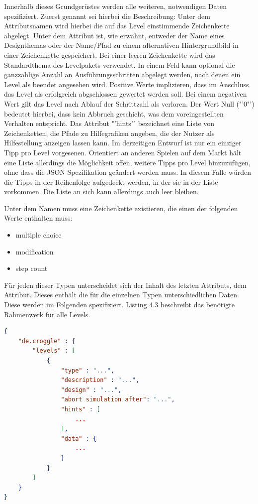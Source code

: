 Innerhalb dieses Grundgerüstes werden alle weiteren, notwendigen Daten spezifiziert.
Zuerst genannt sei hierbei die Beschreibung: Unter dem Attributsnamen  wird hierbei die auf das Level einstimmende Zeichenkette abgelegt.
Unter dem Attribut  ist, wie erwähnt, entweder der Name eines Designthemas oder der Name/Pfad zu einem alternativen Hintergrundbild in einer Zeichenkette gespeichert.
Bei einer leeren Zeichenkette wird das Standardthema des Levelpakets verwendet.
In einem Feld  kann optional die ganzzahlige Anzahl an Ausführungsschritten abgelegt werden, nach denen ein Level als beendet angesehen wird.
Positive Werte implizieren, dass im Anschluss das Level als erfolgreich abgschlossen gewertet werden soll.
Bei einem negativen Wert gilt das Level nach Ablauf der Schrittzahl als verloren.
Der Wert Null ("'0"') bedeutet hierbei, dass kein Abbruch geschieht, was dem voreingestellten Verhalten entspricht.
Das Attribut "'hints"' bezeichnet eine Liste von Zeichenketten, die Pfade zu Hilfegrafiken angeben, die der Nutzer als Hilfestellung anzeigen lassen kann.
Im derzeitigen Entwurf ist nur ein einziger Tipp pro Level vorgesenen.
Orientiert an anderen Spielen auf dem Markt hält eine Liste allerdings die Möglichkeit offen, weitere Tipps pro Level hinzuzufügen, ohne dass die JSON Spezifikation geändert werden muss.
In diesem Falle würden die Tipps in der Reihenfolge aufgedeckt werden, in der sie in der Liste vorkommen.
Die Liste an sich kann allerdings auch leer bleiben.

Unter dem Namen  muss eine Zeichenkette existieren, die einen der folgenden Werte enthalten muss:
\begin{itemize}
	\item multiple choice
	\item modification
	\item step count
\end{itemize}

Für jeden dieser Typen unterscheidet sich der Inhalt des letzten Attributs, dem  Attribut.
Dieses enthält die für die einzelnen Typen unterschiedlichen Daten.
Diese werden im Folgenden spezifiziert.
Listing 4.3 beschreibt das benötigte Rahmenwerk für alle Levels.
\begin{lstlisting}[language=json,caption={JSON Leveldatei, z.B. json/00/00.json}]
{
	"de.croggle" : {
		"levels" : [
			{
				"type" : "...",
				"description" : "...",
				"design" : "...",
				"abort simulation after": "...",
				"hints" : [
					...
				],
				"data" : {
					...
				}
			}
		]
	}
}
\end{lstlisting}

